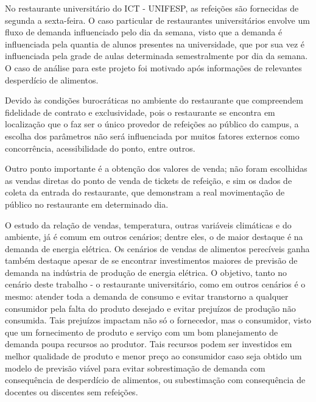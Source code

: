 \documentclass[	12pt, Times, openright, twoside, a4paper, english, brazil]{abntex2}
\begin{document}
        No restaurante universitário do ICT - UNIFESP, as refeições são fornecidas de segunda a sexta-feira. O caso particular de restaurantes universitários envolve um fluxo de demanda influenciado pelo dia da semana, visto que a demanda é influenciada pela quantia de alunos presentes na universidade, que por sua vez é influenciada pela grade de aulas determinada semestralmente por dia da semana. O caso de análise para este projeto foi motivado após informações de relevantes desperdício de alimentos.

        Devido às condições burocráticas no ambiente do restaurante que compreendem fidelidade de contrato e exclusividade, pois o restaurante se encontra em localização que o faz ser o único provedor de refeições ao público do campus, 
        a escolha dos parâmetros não será influenciada por muitos fatores externos como concorrência, acessibilidade do ponto, entre outros.

        Outro ponto importante é a obtenção dos valores de venda; não foram escolhidas as vendas diretas do ponto de venda de tickets de refeição, e sim os dados de coleta da entrada do restaurante, que demonstram a real movimentação de público no restaurante em determinado dia.

        O estudo da relação de vendas, temperatura, outras variáveis climáticas e do ambiente, já é comum em outros cenários; dentre eles, o de maior destaque é na demanda de energia elétrica. Os cenários de vendas de alimentos perecíveis ganha também destaque apesar de se encontrar investimentos maiores de previsão de demanda na indústria de produção de energia elétrica. O objetivo, tanto no cenário deste trabalho - o restaurante universitário, como em outros cenários é o mesmo: atender toda a demanda de consumo e evitar transtorno a qualquer consumidor pela falta do produto desejado e evitar prejuízos de produção não consumida. Tais prejuízos impactam não só o fornecedor, mas o consumidor, visto que um fornecimento de produto e serviço com um bom planejamento de demanda poupa recursos ao produtor. Tais recursos podem ser investidos em melhor qualidade de produto e menor preço ao consumidor caso seja obtido um modelo de previsão viável para evitar sobrestimação de demanda com consequência de desperdício de alimentos, ou subestimação com consequência de docentes ou discentes sem refeições. 
\end{document}
